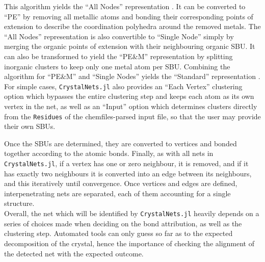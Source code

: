 \documentclass[main.tex]{subfiles}
\begin{document}
This algorithm yields the ``All Nodes'' representation . It can be converted to ``PE'' by removing all metallic atoms and bonding their corresponding points of extension to describe the coordination polyhedra around the removed metals. The ``All Nodes'' representation is also convertible to ``Single Node'' simply by merging the organic points of extension with their neighbouring organic SBU. It can also be transformed to yield the ``PE\&M'' representation by splitting inorganic clusters to keep only one metal atom per SBU. Combining the algorithm for ``PE\&M'' and ``Single Nodes'' yields the ``Standard'' representation \autocite{BlatovSimplify}. For simple cases, \texttt{CrystalNets.jl} also provides an ``Each Vertex'' clustering option which bypasses the entire clustering step and keeps each atom as its own vertex in the net, as well as an ``Input'' option which determines clusters directly from the \texttt{Residues} of the chemfiles-parsed input file, so that the user may provide their own SBUs.



Once the SBUs are determined, they are converted to vertices and bonded together according to the atomic bonds. %
Finally, as with all nets in \texttt{CrystalNets.jl}, if a vertex has one or zero neighbour, it is removed, and if it has exactly two neighbours it is converted into an edge between its neighbours, and this iteratively until convergence. Once vertices and edges are defined, interpenetrating nets are separated, each of them accounting for a single structure.\\

Overall, the net which will be identified by \texttt{CrystalNets.jl} heavily depends on a series of choices made when deciding on the bond attribution, as well as the clustering step. Automated tools can only guess so far as to the expected decomposition of the crystal, hence the importance of checking the alignment of the detected net with the expected outcome.
\end{document}

